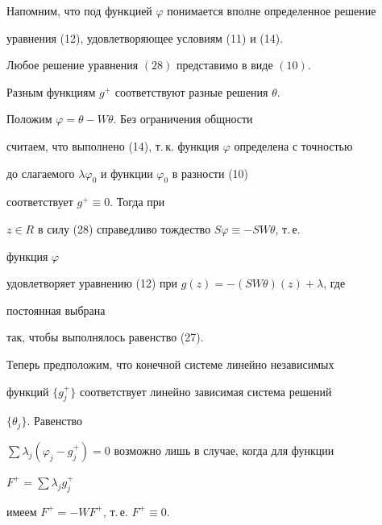 Напомним, что под функцией $\varphi$ понимается вполне определенное решение 


уравнения (12), удовлетворяющее условиям (11) и (14). 


 


 


\begin{thm} 


Любое решение уравнения $(28)$ представимо в виде $(10)$. 


Разным функциям $g^+$ соответствуют разные решения $\theta$. 


\end{thm} 


 


 


\begin{pf} 


Положим $\varphi=\theta-W\theta$. Без ограничения общности 


считаем, что выполнено (14), т.\,к. функция $\varphi$ определена с точностью 


до слагаемого $\lambda\varphi_0$ и функции $\varphi_0$ в разности (10) 


соответствует $g^+\equiv0$. Тогда при 


$z\in R$ в силу (28) справедливо тождество $S\varphi\equiv-SW\theta$, т.\,е. 


функция $\varphi$ 


удовлетворяет уравнению (12) при $g(z)=-(SW\theta)(z)+\lambda$, где 


постоянная выбрана 


так, чтобы выполнялось равенство (27). 


 


Теперь предположим, что конечной системе линейно независимых 


функций $\{g^+_j\}$ соответствует линейно зависимая система решений 


$\{\theta_j\}$. Равенство 


$\sum\lambda_j(\varphi_j-g^+_j)=0$ возможно лишь в случае, когда для функции 


$F^+=\sum\lambda_j g^+_j$ 


имеем $F^+=-WF^+$, т.\,е. $F^+\equiv0$. 


\end{pf} 


 


